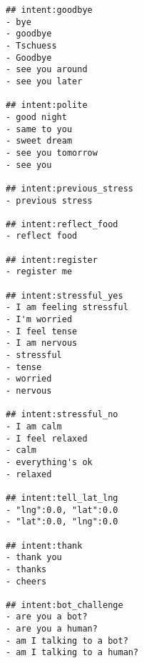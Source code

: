 \begin{lstlisting}
## intent:goodbye
- bye
- goodbye
- Tschuess
- Goodbye
- see you around
- see you later

## intent:polite
- good night
- same to you
- sweet dream
- see you tomorrow
- see you

## intent:previous_stress
- previous stress

## intent:reflect_food
- reflect food

## intent:register
- register me

## intent:stressful_yes
- I am feeling stressful
- I'm worried
- I feel tense
- I am nervous
- stressful
- tense
- worried
- nervous

## intent:stressful_no
- I am calm
- I feel relaxed
- calm
- everything's ok
- relaxed

## intent:tell_lat_lng
- "lng":0.0, "lat":0.0
- "lat":0.0, "lng":0.0

## intent:thank
- thank you
- thanks
- cheers

## intent:bot_challenge
- are you a bot?
- are you a human?
- am I talking to a bot?
- am I talking to a human?
\end{lstlisting}

\bigskip\bigskip
